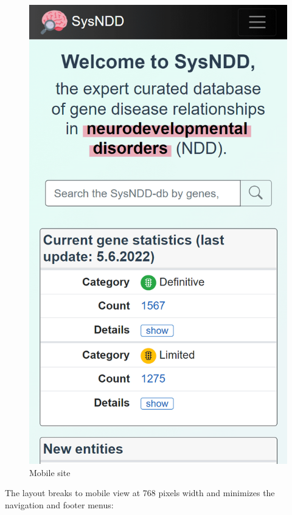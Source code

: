 \documentclass[
]{article}
\begin{document}
\begin{figure}
\centering
\includegraphics{./static/img/02_19-mobile-site.png}
\caption{Mobile site}
\end{figure}

The layout breaks to mobile view at 768 pixels width and minimizes the navigation and footer menus:
\end{document}
